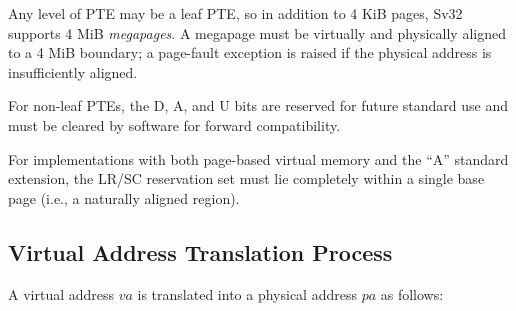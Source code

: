 Any level of PTE may be a leaf PTE, so in addition to 4 KiB pages, Sv32
supports 4 MiB {\em megapages}.  A megapage must be virtually and
physically aligned to a 4 MiB boundary; a page-fault exception is raised
if the physical address is insufficiently aligned.

For non-leaf PTEs, the D, A, and U bits are reserved for future standard use and
must be cleared by software for forward compatibility.

For implementations with both page-based virtual memory and the ``A'' standard
extension, the LR/SC reservation set must lie completely within a single
base page (i.e., a naturally aligned  region).

\subsection{Virtual Address Translation Process}
\label{sv32algorithm}

A virtual address $va$ is translated into a physical address $pa$ as
follows:

